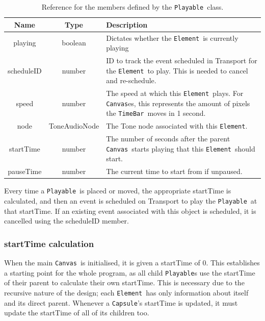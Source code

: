 \documentclass[12pt,a4paper,oneside,openright]{report}
\newcommand{\element}{\texttt{Element}}
\newcommand{\canvas}{\texttt{Canvas}}
\newcommand{\timebar}{\texttt{TimeBar}}
\newcommand{\playable}{\texttt{Playable}}
\newcommand{\capsule}{\texttt{Capsule}}
\begin{document}
\begin{table}[h]
    \centering
    \begin{tabular}{c|c|p{280pt}}
        Name & Type & Description \\
        \hline
        playing & boolean & Dictates whether the \element\ is currently playing\\
        scheduleID & number & ID to track the event scheduled in Transport for the \element\ to play. This is needed to cancel and re-schedule.\\
        speed & number & The speed at which this \element\ plays. For \canvas es, this represents the amount of pixels the \timebar\ moves in 1 second.\\
        node & ToneAudioNode & The Tone node associated with this \element.\\
        startTime & number & The number of seconds after the parent \canvas\ starts playing that this \element\ should start.\\
        pauseTime & number & The current time to start from if unpaused.\\
    \end{tabular}
    \caption{Reference for the members defined by the \playable\ class.}
    \label{tab:playable_members}
\end{table}

Every time a \playable\ is placed or moved, the appropriate startTime is calculated, and then an event is scheduled on Transport to play the \playable\ at that startTime. If an existing event associated with this object is scheduled, it is cancelled using the scheduleID member.

\subsubsection{startTime calculation}
When the main \canvas\ is initialised, it is given a startTime of 0. This establishes a starting point for the whole program, as all child \playable s use the startTime of their parent to calculate their own startTime. This is necessary due to the recursive nature of the design; each \element\ has only information about itself and its direct parent. Whenever a \capsule's startTime is updated, it must update the startTime of all of its children too.
\end{document}
